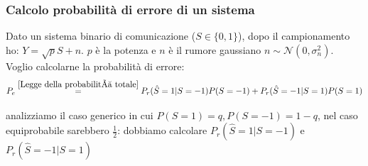         \subsubsection{Calcolo probabilità di errore di un sistema} 
            Dato un sistema binario di comunicazione ($S\in\{0,1\}$), dopo il campionamento ho: $Y = \sqrt{p}S+n$. $p$ è la potenza e $n$ è il rumore
            gaussiano $n \sim \mathcal{N}(0,\sigma_n^2)$. Voglio calcolarne la probabilità di errore:
            \[
                P_e \overset{\ref{Legge della probabilità totale}}{=} P_r(\hat{S}=1|S=-1)P(S=-1)+ P_r(\hat{S}=-1|S=1)P(S=1)   
            \] 
            \begin{sloppypar}
                \noindent analizziamo il caso generico in cui ${P(S=1) = q, P(S=-1)=1-q}$, nel caso equiprobabile sarebbero $\frac{1}{2}$: dobbiamo calcolare 
                ${P_r(\hat{S}=1|S=-1)}$ e ${P_r(\hat{S}=-1|S=1)}$
            \end{sloppypar}
